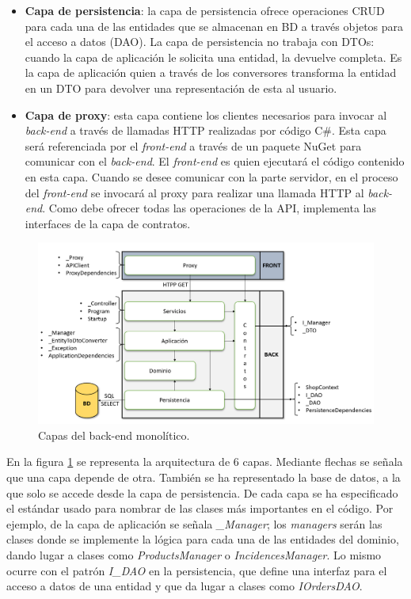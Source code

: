 \documentclass[11pt,spanish,listoffigures]{tfgetsinf}
\begin{document}
\begin{itemize}
\item \textbf{Capa de persistencia}: la capa de persistencia ofrece operaciones CRUD para cada una de las entidades que se almacenan en BD a través objetos para el acceso a datos (DAO). La capa de persistencia no trabaja con DTOs: cuando la capa de aplicación le solicita una entidad, la devuelve completa. Es la capa de aplicación quien a través de los conversores transforma la entidad en un DTO para devolver una representación de esta al usuario.

\item \textbf{Capa de proxy}: esta capa contiene los clientes necesarios para invocar al \textit{back-end} a través de llamadas HTTP realizadas por código C\#. Esta capa será referenciada por el \textit{front-end} a través de un paquete NuGet para comunicar con el \textit{back-end}. El \textit{front-end} es quien ejecutará el código contenido en esta capa. Cuando se desee comunicar con la parte servidor, en el proceso del \textit{front-end} se invocará al proxy para realizar una llamada HTTP al \textit{back-end}. Como debe ofrecer todas las operaciones de la API, implementa las interfaces de la capa de contratos.

\end{itemize}

\begin{figure}[h]
\centering
\includegraphics[scale=0.5]{capas}
\caption{Capas del back-end monolítico.}
\label{fig:capas}
\end{figure}

En la figura \ref{fig:capas} se representa la arquitectura de 6 capas. Mediante flechas se señala que una capa depende de otra. También se ha representado la base de datos, a la que solo se accede desde la capa de persistencia. De cada capa se ha especificado el estándar usado para nombrar de las clases más importantes en el código. Por ejemplo, de la capa de aplicación se señala \textit{\_Manager}; los \textit{managers} serán las clases donde se implemente la lógica para cada una de las entidades del dominio, dando lugar a clases como \textit{ProductsManager} o \textit{IncidencesManager}. Lo mismo ocurre con el patrón \textit{I\_DAO} en la persistencia, que define una interfaz para el acceso a datos de una entidad y que da lugar a clases como \textit{IOrdersDAO}.
\end{document}
